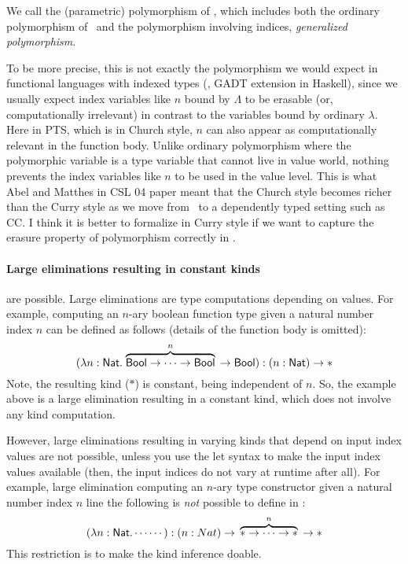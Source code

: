 We call the (parametric) polymorphism of \Fi, which includes
both the ordinary polymorphism of \Fw\ and the polymorphism involving indices,
\emph{generalized polymorphism}.

To be more precise, this is not exactly the polymorphism we would expect
in functional languages with indexed types (\eg, GADT extension in Haskell),
since we usually expect index variables like $n$ bound by $\Lambda$ to be
erasable (or, computationally irrelevant) in contrast to the variables bound
by ordinary $\lambda$. Here in PTS, which is in Church style, $n$ can also
appear as computationally relevant in the function body. Unlike ordinary
polymorphism where the polymorphic variable is a type variable that cannot
live in value world, nothing prevents the index variables like $n$ to be used
in the value level. This is what Abel and Matthes in CSL 04 paper meant that
the Church style becomes richer than the Curry style as we move from \Fw\ to
a dependently typed setting such as CC. I think it is better to formalize
in Curry style if we want to capture the erasure property of polymorphism
correctly in \Fi.

\paragraph{Large eliminations resulting in constant kinds} are possible.
Large eliminations are type computations depending on values.  For example,
computing an $n$-ary boolean function type given a natural number index $n$
can be defined as follows (details of the function body is omitted):
\[
(\lambda n:\mathsf{Nat}. \stackrel{n}{\overbrace{\mathsf{Bool}-> \cdots-> \mathsf{Bool}}}\;\, -> \mathsf{Bool})
  : (n:\mathsf{Nat}) -> *
\]
Note, the resulting kind ($*$) is constant, being independent of $n$.
So, the example above is a large elimination resulting in a constant kind,
which does not involve any kind computation.

However, large eliminations resulting in varying kinds that depend on
input index values are not possible, unless you use the let syntax to make
the input index values available (then, the input indices do not vary
at runtime after all). For example, large elimination computing an $n$-ary
type constructor given a natural number index $n$ line the following
is \emph{not} possible to define in \Fi:
\[
(\lambda n:\mathsf{Nat}. \cdots \cdots)
  : (n:Nat) -> \,\;\stackrel{n}{\overbrace{* -> \cdots -> *}}\;\, -> *
\]
This restriction is to make the kind inference doable.

